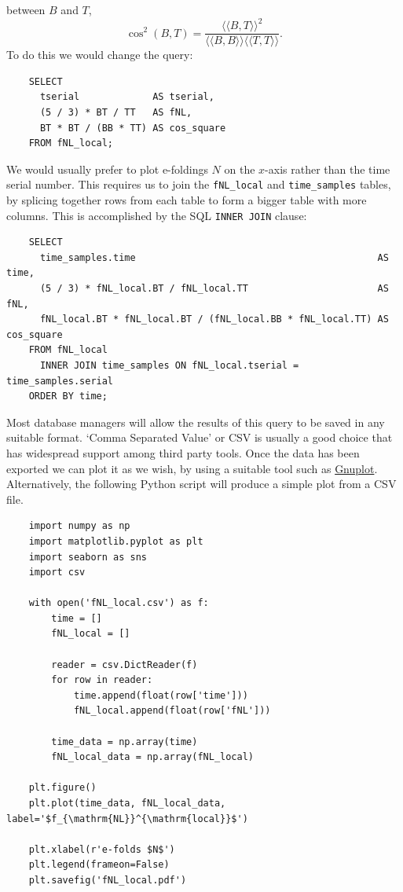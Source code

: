 \documentclass[11pt,a4paper]{article}
\newcommand{\iprod}[2]{\langle\!\langle {#1}, {#2} \rangle\!\rangle}
\begin{document}
between $B$ and $T$,
\begin{equation}
    \cos^2 (B,T) = \frac{\iprod{B}{T}^2}{\iprod{B}{B} \iprod{T}{T}} .
\end{equation}
To do this we would change the query:
\begin{verbatim}
    SELECT
      tserial             AS tserial,
      (5 / 3) * BT / TT   AS fNL,
      BT * BT / (BB * TT) AS cos_square
    FROM fNL_local;    
\end{verbatim}
We would usually prefer to plot e-foldings $N$ on the $x$-axis rather than the
time serial number.
This requires us to join the
\texttt{fNL_local} and
\texttt{time_samples} tables,
by splicing together rows from each table
to form a bigger table with more columns.
This is accomplished by the SQL
\texttt{INNER JOIN} clause:
\begin{verbatim}
    SELECT
      time_samples.time                                           AS time,
      (5 / 3) * fNL_local.BT / fNL_local.TT                       AS fNL,
      fNL_local.BT * fNL_local.BT / (fNL_local.BB * fNL_local.TT) AS cos_square
    FROM fNL_local
      INNER JOIN time_samples ON fNL_local.tserial = time_samples.serial
    ORDER BY time;
\end{verbatim}
Most database managers will allow the results of this query to be saved
in any suitable format.
`Comma Separated Value' or CSV is usually a good choice that has
widespread support among third party tools.
Once the data has been exported we can plot it as we wish,
by using a suitable tool such as
\href{http://www.gnuplot.info}{Gnuplot}.
Alternatively, the following Python script will produce a simple plot
from a CSV file.
\begin{verbatim}
    import numpy as np
    import matplotlib.pyplot as plt
    import seaborn as sns
    import csv
    
    with open('fNL_local.csv') as f:
        time = []
        fNL_local = []
    
        reader = csv.DictReader(f)
        for row in reader:
            time.append(float(row['time']))
            fNL_local.append(float(row['fNL']))
    
        time_data = np.array(time)
        fNL_local_data = np.array(fNL_local)
    
    plt.figure()
    plt.plot(time_data, fNL_local_data, label='$f_{\mathrm{NL}}^{\mathrm{local}}$')
    
    plt.xlabel(r'e-folds $N$')
    plt.legend(frameon=False)
    plt.savefig('fNL_local.pdf')    
\end{verbatim}
\end{document}
